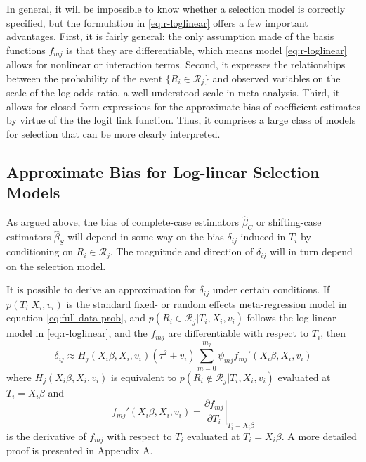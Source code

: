 \documentclass[
]{article}
\begin{document}
In general, it will be impossible to know whether a selection model is correctly specified, but the formulation in \eqref{eq:r-loglinear} offers a few important advantages.
First, it is fairly general: the only assumption made of the basis functions \(f_{mj}\) is that they are differentiable, which means model \eqref{eq:r-loglinear} allows for nonlinear or interaction terms.
Second, it expresses the relationships between the probability of the event \(\{R_i \in \mathcal{R}_j\}\) and observed variables on the scale of the log odds ratio, a well-understood scale in meta-analysis.
Third, it allows for closed-form expressions for the approximate bias of coefficient estimates by virtue of the the logit link function.
Thus, it comprises a large class of models for selection that can be more clearly interpreted.

\hypertarget{approximate-bias-for-log-linear-selection-models}{%
\subsection{Approximate Bias for Log-linear Selection Models}\label{approximate-bias-for-log-linear-selection-models}}

As argued above, the bias of complete-case estimators \(\hat{\beta}_C\) or shifting-case estimators \(\hat{\beta}_S\) will depend in some way on the bias \(\delta_{ij}\) induced in \(T_i\) by conditioning on \(R_i \in \mathcal{R}_j\).
The magnitude and direction of \(\delta_{ij}\) will in turn depend on the selection model.

It is possible to derive an approximation for \(\delta_{ij}\) under certain conditions.
If \(p(T_i | X_i, v_i)\) is the standard fixed- or random effects meta-regression model in equation \eqref{eq:full-data-prob}, and \(p(R_i \in \mathcal{R}_j | T_i, X_i, v_i)\) follows the log-linear model in \eqref{eq:r-loglinear}, and the \(f_{mj}\) are differentiable with respect to \(T_i\), then
\begin{equation}
\delta_{ij} \approx H_j(X_i \beta, X_i, v_i)(\tau^2 + v_i)\sum_{m = 0}^{m_j} \psi_{mj} f_{mj}'(X_i \beta, X_i, v_i)
\label{eq:conditional-bias}
\end{equation}
where \(H_j(X_i \beta, X_i, v_i)\) is equivalent to \(p(R_i \not\in \mathcal{R}_j | T_i, X_i, v_i)\) evaluated at \(T_i = X_i\beta\) and
\[
f_{mj}'(X_i\beta, X_i, v_i) = \left.\frac{\partial f_{mj}}{\partial T_i}\right\rvert_{T_i = X_i\beta}
\]
is the derivative of \(f_{mj}\) with respect to \(T_i\) evaluated at \(T_i = X_i\beta\).
A more detailed proof is presented in Appendix A.
\end{document}
